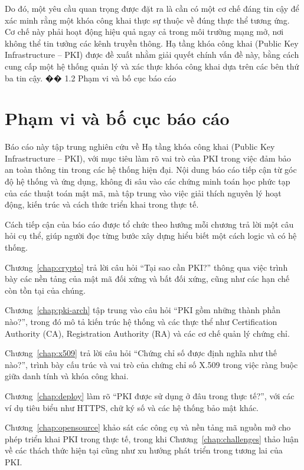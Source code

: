 Do đó, một yêu cầu quan trọng được đặt ra là cần có một cơ chế đáng tin cậy để xác minh rằng một khóa công khai thực sự thuộc về đúng thực thể tương ứng. Cơ chế này phải hoạt động hiệu quả ngay cả trong môi trường mạng mở, nơi không thể tin tưởng các kênh truyền thông. Hạ tầng khóa công khai (Public Key Infrastructure – PKI) được đề xuất nhằm giải quyết chính vấn đề này, bằng cách cung cấp một hệ thống quản lý và xác thực khóa công khai dựa trên các bên thứ ba tin cậy.
�� 1.2 Phạm vi và bố cục báo cáo
\section{Phạm vi và bố cục báo cáo}
\label{sec:1.2}

Báo cáo này tập trung nghiên cứu về Hạ tầng khóa công khai (Public Key Infrastructure – PKI), với mục tiêu làm rõ vai trò của PKI trong việc đảm bảo an toàn thông tin trong các hệ thống hiện đại. Nội dung báo cáo tiếp cận từ góc độ hệ thống và ứng dụng, không đi sâu vào các chứng minh toán học phức tạp của các thuật toán mật mã, mà tập trung vào việc giải thích nguyên lý hoạt động, kiến trúc và cách thức triển khai trong thực tế.

Cách tiếp cận của báo cáo được tổ chức theo hướng mỗi chương trả lời một câu hỏi cụ thể, giúp người đọc từng bước xây dựng hiểu biết một cách logic và có hệ thống.

Chương~\ref{chap:crypto} trả lời câu hỏi “Tại sao cần PKI?” thông qua việc trình bày các nền tảng của mật mã đối xứng và bất đối xứng, cũng như các hạn chế còn tồn tại của chúng. 

Chương~\ref{chap:pki-arch} tập trung vào câu hỏi “PKI gồm những thành phần nào?”, trong đó mô tả kiến trúc hệ thống và các thực thể như Certification Authority (CA), Registration Authority (RA) và các cơ chế quản lý chứng chỉ.

Chương~\ref{chap:x509} trả lời câu hỏi “Chứng chỉ số được định nghĩa như thế nào?”, trình bày cấu trúc và vai trò của chứng chỉ số X.509 trong việc ràng buộc giữa danh tính và khóa công khai.

Chương~\ref{chap:deploy} làm rõ “PKI được sử dụng ở đâu trong thực tế?”, với các ví dụ tiêu biểu như HTTPS, chữ ký số và các hệ thống bảo mật khác.

Chương~\ref{chap:opensource} khảo sát các công cụ và nền tảng mã nguồn mở cho phép triển khai PKI trong thực tế, trong khi Chương~\ref{chap:challenges} thảo luận về các thách thức hiện tại cũng như xu hướng phát triển trong tương lai của PKI.
